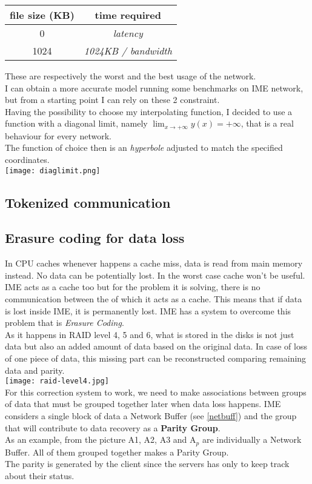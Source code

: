 \vspace{0.5cm}
\begin{tabular}{c | c}
    file size (KB) & time required \\ \hline
    0 & \textit{latency} \\ \hline
    1024 & \textit{1024KB / bandwidth}
\end{tabular}
\vspace{0.5cm}

These are respectively the worst and the best usage of the network. \\
I can obtain a more accurate model running some benchmarks on IME network, but
from a starting point I can rely on these 2 constraint. \\
Having the possibility to choose my interpolating function, I decided to use a
function with a diagonal limit, namely $\lim_{x \to +\infty} y(x) = +\infty$, that is a real behaviour
for every network. \\
The function of choice then is an \textit{hyperbole} adjusted to match the
specified coordinates. \\
\texttt{[image: diaglimit.png]}


\subsection{Tokenized communication}
\subsection{Erasure coding for data loss} \label{pargroup}
In CPU caches whenever happens a cache miss, data is read from main memory
instead. No data can be potentially lost. In the worst case cache won't be
useful. \\ 
IME acts as a cache too but for the problem it is solving, there is no
communication between the of which it acts as a cache. This means that if data
is lost inside IME, it is permanently lost. IME has a system to overcome this
problem that is \textit{Erasure Coding}. \\
As it happens in RAID level 4, 5 and 6, what is stored in the disks is not just
data but also an added amount of data based on the original data. In case of 
loss of one piece of data, this missing part can be reconstructed comparing
remaining data and parity. \\
\texttt{[image: raid-level4.jpg]} \\
For this correction system to work, we need to make associations between groups
of data that must be grouped together later when data loss happens. IME
considers a single block of data a Network Buffer (see \ref{netbuff}) and the
group that will contribute to data recovery as a \textbf{Parity Group}. \\
As an example, from the picture A1, A2, A3 and A$_p$ are individually a Network
Buffer. All of them grouped together makes a Parity Group. \\
The parity is generated by the client since the servers has only to keep track
about their status.



